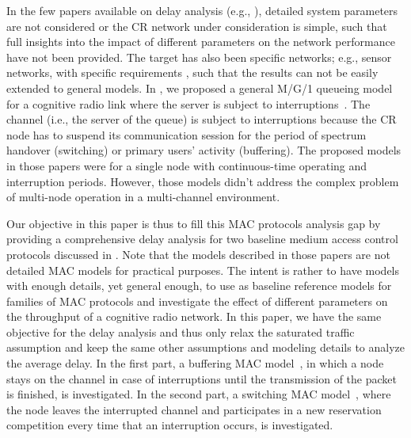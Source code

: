 \documentclass[12pt,journal,oneside,onecolumn]{IEEEtran}
\begin{document}
In the few papers available on delay analysis (e.g., \cite{rashid07,S-Wang12, wang12,laourine10,kim12}), detailed system parameters are not considered or the CR network under consideration is simple, such that full insights into the impact of different parameters on the network performance have not been provided. The target has also been specific networks; e.g., sensor networks, with specific requirements \cite{bicen12}, such that the results can not be easily extended to general models. 
In \cite{azarfar12e,azarfar13f}, we proposed a general M/G/1 queueing model~\cite{kleinrock75} for a cognitive radio link where the server is subject to interruptions~\cite{takagi91}.
The channel (i.e., the server of the queue) is subject to interruptions because the CR node has to suspend its communication session for the period of spectrum handover (switching) or primary users' activity (buffering).
The proposed models in those papers  were for a single node with continuous-time operating and interruption periods. However, those models didn't address the complex problem of multi-node operation in a multi-channel environment. 

Our objective in this paper is thus to fill this MAC protocols analysis gap by providing a comprehensive delay analysis for two baseline medium access control protocols discussed in \cite{pawelczak09,park11}. Note that the models described in those papers are not detailed MAC models for practical purposes. 
The intent is rather to have models with enough details, yet general enough, to use as baseline reference models 
for families of MAC protocols and investigate the effect of different parameters on the throughput of a cognitive radio network. 
In this paper, we have the same objective for the delay analysis and thus only relax the saturated traffic 
assumption and keep the same other assumptions and modeling details to analyze the average delay. 
In the first part, a buffering MAC model~\cite{pawelczak09,park11}, in which a node stays on the channel in case of interruptions 
until the transmission of the packet is finished, is investigated. In the second part, a switching MAC model~\cite{park11}, 
where the node leaves the interrupted channel and participates in a new reservation competition every time that an interruption occurs, is investigated.
\end{document}
